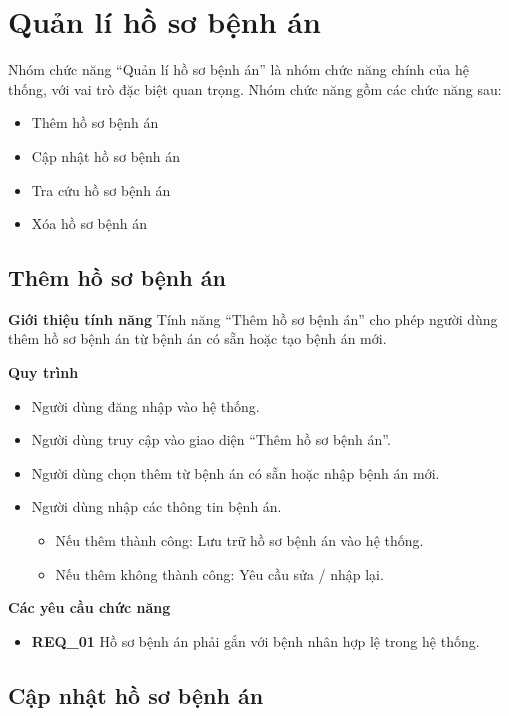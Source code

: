 \section{Quản lí hồ sơ bệnh án}

Nhóm chức năng ``Quản lí hồ sơ bệnh án'' là nhóm chức năng chính của hệ thống, với vai trò đặc biệt quan trọng. Nhóm chức năng gồm các chức năng sau:
\begin{itemize}
    \item Thêm hồ sơ bệnh án
    \item Cập nhật hồ sơ bệnh án
    \item Tra cứu hồ sơ bệnh án
    \item Xóa hồ sơ bệnh án
\end{itemize}

\subsection{Thêm hồ sơ bệnh án}

\noindent \textbf{Giới thiệu tính năng}
Tính năng ``Thêm hồ sơ bệnh án'' cho phép người dùng thêm hồ sơ bệnh án từ bệnh án có sẵn hoặc tạo bệnh án mới.

\noindent \textbf{Quy trình}
\begin{itemize}
    \item Người dùng đăng nhập vào hệ thống.
    \item Người dùng truy cập vào giao diện ``Thêm hồ sơ bệnh án''.
    \item Người dùng chọn thêm từ bệnh án có sẵn hoặc nhập bệnh án mới.
    \item Người dùng nhập các thông tin bệnh án.
    \begin{itemize}
        \item Nếu thêm thành công: Lưu trữ hồ sơ bệnh án vào hệ thống.
        \item Nếu thêm không thành công: Yêu cầu sửa / nhập lại.
    \end{itemize}
\end{itemize}

\noindent \textbf{Các yêu cầu chức năng}
\begin{itemize}
    \item \textbf{REQ\_01} Hồ sơ bệnh án phải gắn với bệnh nhân hợp lệ trong hệ thống.
\end{itemize}

\subsection{Cập nhật hồ sơ bệnh án}

